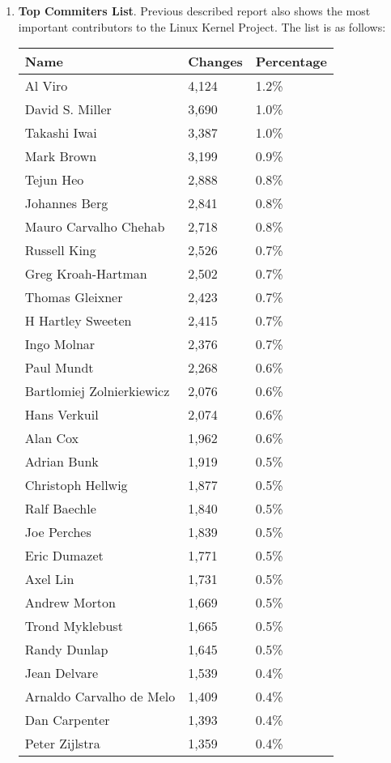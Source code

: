 \documentclass[11pt]{article}
\begin{document}
\begin{enumerate}
\item{\textbf{Top Commiters List}}. Previous described report also shows the most important contributors to the Linux Kernel Project. The list is as follows:
\begin{center}
    \begin{tabular}{ | l | l | l | }
    \hline
    Name & Changes & Percentage\\
    \hline
    Al Viro                    & 4,124 & 1.2\%\\
    David S. Miller            & 3,690 & 1.0\%\\
    Takashi Iwai               & 3,387 & 1.0\%\\
    Mark Brown                 & 3,199 & 0.9\%\\
    Tejun Heo                  & 2,888 & 0.8\%\\
    Johannes Berg              & 2,841 & 0.8\%\\
    Mauro Carvalho Chehab      & 2,718 & 0.8\%\\
    Russell King               & 2,526 & 0.7\%\\
    Greg Kroah-Hartman         & 2,502 & 0.7\%\\
    Thomas Gleixner            & 2,423 & 0.7\%\\
    H Hartley Sweeten          & 2,415 & 0.7\%\\
    Ingo Molnar                & 2,376 & 0.7\%\\
    Paul Mundt                 & 2,268 & 0.6\%\\
    Bartlomiej Zolnierkiewicz  & 2,076 & 0.6\%\\
    Hans Verkuil               & 2,074 & 0.6\%\\
    Alan Cox                   & 1,962 & 0.6\%\\
    Adrian Bunk                & 1,919 & 0.5\%\\
    Christoph Hellwig          & 1,877 & 0.5\%\\
    Ralf Baechle               & 1,840 & 0.5\%\\
    Joe Perches                & 1,839 & 0.5\%\\
    Eric Dumazet               & 1,771 & 0.5\%\\
    Axel Lin                   & 1,731 & 0.5\%\\
    Andrew Morton              & 1,669 & 0.5\%\\
    Trond Myklebust            & 1,665 & 0.5\%\\
    Randy Dunlap               & 1,645 & 0.5\%\\
    Jean Delvare               & 1,539 & 0.4\%\\
    Arnaldo Carvalho de Melo   & 1,409 & 0.4\%\\
    Dan Carpenter              & 1,393 & 0.4\%\\
    Peter Zijlstra             & 1,359 & 0.4\%\\            
    \hline
    \end{tabular}
\end{center}


\end{enumerate}
\end{document}
